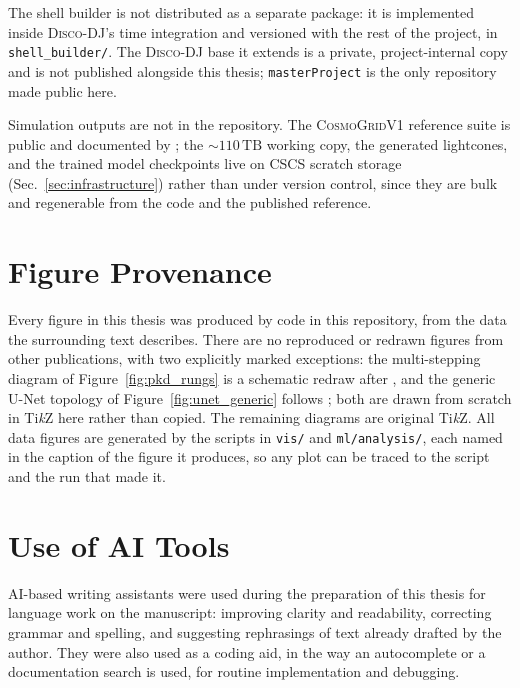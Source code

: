 \documentclass{report}
\begin{document}
The shell builder is not distributed as a separate package: it is implemented inside
\textsc{Disco-DJ}'s time integration and versioned with the rest of the project, in
\texttt{shell\_builder/}. The \textsc{Disco-DJ} base it extends
\cite{hahn_disco-dj_2024, list_disco-dj_2026} is a private, project-internal copy and is not
published alongside this thesis; \texttt{masterProject} is the only repository made public here.

Simulation outputs are not in the repository. The \textsc{CosmoGridV1} reference suite is
public and documented by \citeauthor{kacprzak_cosmogridv1_2023}
\cite{kacprzak_cosmogridv1_2023}; the \mbox{$\sim110\,\mathrm{TB}$} working copy, the
generated lightcones, and the trained model checkpoints live on CSCS scratch storage
(Sec.~\ref{sec:infrastructure}) rather than under version control, since they are bulk
and regenerable from the code and the published reference.

\section{Figure Provenance}
\label{app:figure-provenance}

Every figure in this thesis was produced by code in this repository, from the data the
surrounding text describes. There are no reproduced or redrawn figures from other
publications, with two explicitly marked exceptions: the multi-stepping diagram of
Figure~\ref{fig:pkd_rungs} is a schematic redraw after
\citeauthor{potter_pkdgrav3_2016} \cite{potter_pkdgrav3_2016}, and the generic U-Net
topology of Figure~\ref{fig:unet_generic} follows
\citeauthor{ronneberger_u-net_2015} \cite{ronneberger_u-net_2015}; both are drawn from
scratch in Ti\emph{k}Z here rather than copied. The remaining diagrams are original
Ti\emph{k}Z. All data figures are generated by the scripts in \texttt{vis/} and
\texttt{ml/analysis/}, each named in the caption of the figure it produces, so any plot
can be traced to the script and the run that made it.

\section{Use of AI Tools}
\label{app:ai-tools}

AI-based writing assistants were used during the preparation of this thesis for language
work on the manuscript: improving clarity and readability, correcting grammar and
spelling, and suggesting rephrasings of text already drafted by the author. They were
also used as a coding aid, in the way an autocomplete or a documentation search is used,
for routine implementation and debugging.
\end{document}
